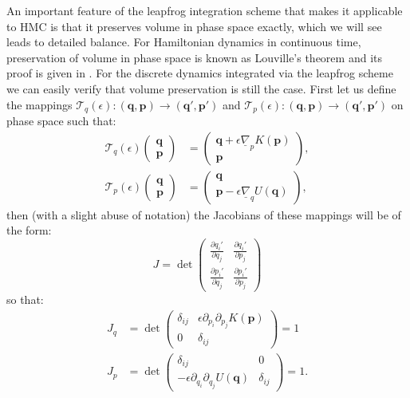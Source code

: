 \documentclass[12pt]{article}
\begin{document}
            An important feature of the leapfrog integration scheme that makes it applicable to HMC is that it preserves volume in phase space exactly, which we will see leads to detailed balance. For Hamiltonian dynamics in continuous time, preservation of volume in phase space is known as Louville's theorem and its proof is given in \cite{goldstein_poole_safko_2014}. For the discrete dynamics integrated via the leapfrog scheme we can easily verify that volume preservation is still the case. First let us define the mappings $\mathcal{T}_q\left(\epsilon\right): \left(\bm{q},\bm{p}\right) \rightarrow \left(\bm{q}',\bm{p}'\right) $ and $\mathcal{T}_p\left(\epsilon\right): \left(\bm{q},\bm{p}\right) \rightarrow \left(\bm{q}',\bm{p}'\right)$ on phase space such that:
            \begin{align}
                \label{eq:psMap1}
                \mathcal{T}_q\left(\epsilon\right)\begin{pmatrix} \bm{q} \\ \bm{p} \end{pmatrix} & = \begin{pmatrix} \bm{q} +\epsilon \underline{\nabla}_pK\left(\bm{p}\right) \\ \bm{p} \end{pmatrix}, \\
                \label{eq:psMap2}
                \mathcal{T}_p\left(\epsilon\right)\begin{pmatrix} \bm{q} \\ \bm{p} \end{pmatrix} & = \begin{pmatrix} \bm{q} \\ \bm{p} - \epsilon \underline{\nabla}_qU\left(\bm{q}\right) \end{pmatrix},
            \end{align}
            then (with a slight abuse of notation) the Jacobians of these mappings will be of the form:
            \begin{equation}
                J = \det\begin{pmatrix}\frac{\partial q_i'}{\partial q_j} & \frac{\partial q_i'}{\partial p_j} \\ \frac{\partial p_i'}{\partial q_j} & \frac{\partial p_i'}{\partial p_j} \end{pmatrix}
            \end{equation}
            so that:
            \begin{align}
            J_q& =\det\begin{pmatrix} \delta_{ij} & \epsilon\partial_{p_i}\partial_{p_j}K\left(\bm{p}\right) \\ 0 & \delta_{ij} \end{pmatrix} = 1 \\
            J_p& =\det\begin{pmatrix} \delta_{ij} &  0  \\ -\epsilon\partial_{q_i}\partial_{q_j}U\left(\bm{q}\right) & \delta_{ij} \end{pmatrix} = 1.
            \end{align}
\end{document}
